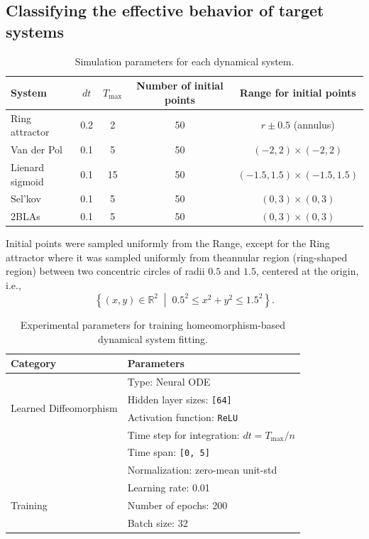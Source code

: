 \documentclass{article}
\theoremstyle{definition} \newtheorem{definition}{Definition}  \newtheorem{example}{Example}
\theoremstyle{remark} \newtheorem{remark}{Remark}
\newcounter{ct}
\begin{document}
\subsection{Classifying the effective behavior of target systems}\label{sec:manytargets_exp_details}
\begin{table}[h!]
\centering
\caption{Simulation parameters for each dynamical system.}
\begin{tabular}{lcccc}
\toprule
\textbf{System} & $dt$ &  $T_{\text{max}}$ & \textbf{Number of initial points} & \textbf{Range for initial points} \\
\midrule
Ring attractor      	&    0.2         &       2        &             50                    &      $r\pm0.5$ (annulus)  \\
Van der Pol          	&    0.1         &       5        &             50                    &       $(-2,2)\times (-2,2)$ \\
Lienard sigmoid    	&    0.1         &      15       &             50                    &        $(-1.5,1.5)\times (-1.5,1.5)$\\
Sel'kov                 	&    0.1         &       5        &             50                    &       $(0,3)\times (0,3)$ \\
2BLAs                  	&    0.1         &       5        &             50                    &       $(0,3)\times (0,3)$ \\
\bottomrule
\end{tabular}
\label{tab:system_params}
\end{table}

Initial points were sampled uniformly from the Range, except for the Ring attractor where it was sampled uniformly from theannular region (ring-shaped region) between two concentric circles of radii $0.5$ and $1.5$, centered at the origin, i.e., 
\[
\left\{ (x, y) \in \mathbb{R}^2 \;\middle|\; 0.5^2 \leq x^2 + y^2 \leq 1.5^2 \right\}.
\]


\begin{table}[h]
\centering
\caption{Experimental parameters for training homeomorphism-based dynamical system fitting.}
\label{tab:training_params}
\begin{tabular}{p{5cm}p{6cm}}
\toprule
\textbf{Category} & \textbf{Parameters} \\
\midrule
\multirow{4}{*}{Learned Diffeomorphism} 
    & Type: Neural ODE \\
    & Hidden layer sizes: \texttt{[64]} \\
    & Activation function: \texttt{ReLU} \\
\midrule
\multirow{5}{*}{Simulation for Target Trajectories} 
    & Time step for integration: $dt = T_{\text{max}}/n$ \\
    & Time span: \texttt{[0, 5]} \\
    & Normalization: zero-mean unit-std \\
\midrule
\multirow{4}{*}{Training} 
    & Learning rate: 0.01 \\
    & Number of epochs: 200 \\
    & Batch size: 32 \\
\bottomrule
\end{tabular}
\end{table}
\end{document}
